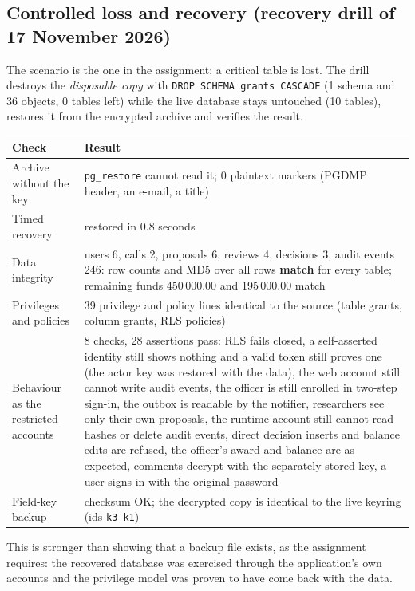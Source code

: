 \documentclass[10pt,a4paper]{article}
\newcommand{\code}[1]{\nolinkurl{#1}}
\newcommand{\tcap}[1]{\captionof{table}{#1}\nopagebreak[4]\vspace{-3pt}}
\begin{document}
\subsection{Controlled loss and recovery (recovery drill of 17 November 2026)}
The scenario is the one in the assignment: a critical table is lost. The drill destroys the \emph{disposable copy} with \code{DROP SCHEMA grants CASCADE} (1 schema and 36 objects, 0 tables left) while the live database stays untouched (10 tables), restores it from the encrypted archive and verifies the result.
\tcap{Recovery drill results}
\begin{center}\small
\begin{tabularx}{\linewidth}{@{}L{4.3cm}Y@{}}
\toprule\textbf{Check} & \textbf{Result}\\\midrule
Archive without the key & \code{pg_restore} cannot read it; 0 plaintext markers (PGDMP header, an e-mail, a title)\\
Timed recovery & restored in 0.8 seconds\\
Data integrity & users 6, calls 2, proposals 6, reviews 4, decisions 3, audit events 246: row counts and MD5 over all rows \textbf{match} for every table; remaining funds 450\,000.00 and 195\,000.00 match\\
Privileges and policies & 39 privilege and policy lines identical to the source (table grants, column grants, RLS policies)\\
Behaviour as the restricted accounts & 8 checks, 28 assertions pass: RLS fails closed, a self-asserted identity still shows nothing and a valid token still proves one (the actor key was restored with the data), the web account still cannot write audit events, the officer is still enrolled in two-step sign-in, the outbox is readable by the notifier, researchers see only their own proposals, the runtime account still cannot read hashes or delete audit events, direct decision inserts and balance edits are refused, the officer's award and balance are as expected, comments decrypt with the separately stored key, a user signs in with the original password\\
Field-key backup & checksum OK; the decrypted copy is identical to the live keyring (ids \code{k3 k1})\\
\bottomrule\end{tabularx}\end{center}
This is stronger than showing that a backup file exists, as the assignment requires: the recovered database was exercised through the application's own accounts and the privilege model was proven to have come back with the data.
\end{document}
